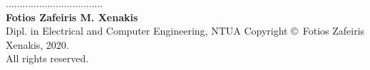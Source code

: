 \documentclass[12pt, a4paper, notitlepage]{report}
\newcommand{\blankpage}{\newpage\null\thispagestyle{empty}\newpage}
\begin{document}
\newpage
\vspace*{14ex}
\noindent
................................... \\
\textbf{Fotios Zafeiris M. Xenakis} \\
Dipl. in Electrical and Computer Engineering, NTUA
\vfill
\small
\noindent
Copyright \copyright\ Fotios Zafeiris Xenakis, 2020. \\
All rights reserved.

\thispagestyle{empty}

\newpage



\blankpage



\blankpage

\tableofcontents
{}

\listoffigures
{}

\listoftables
{}


% 
% 
% 
% 

\appendix




\end{document}
